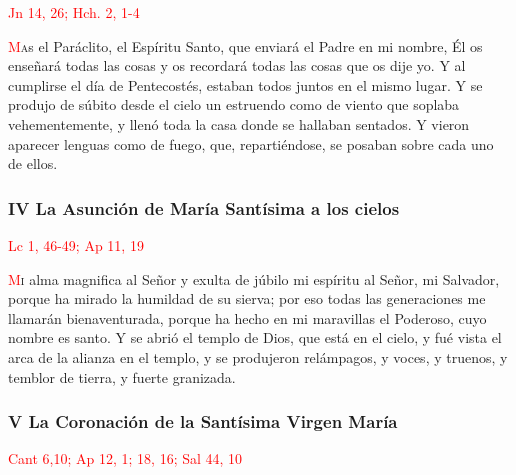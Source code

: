 \documentclass[10pt,twoside]{book}
\begin{document}
\hfill\textcolor{red}{Jn 14, 26; Hch. 2, 1-4}

\lettrine[lines=2]{\textcolor{red}{M}}as el Paráclito, el Espíritu Santo, que enviará el Padre en mi nombre, Él os enseñará todas las cosas y os recordará todas las cosas que os dije yo.
Y al cumplirse el día de Pentecostés, estaban todos juntos en el mismo lugar. Y se produjo de súbito desde el cielo un estruendo como de viento que soplaba vehementemente,
y llenó toda la casa donde se hallaban sentados. Y vieron aparecer lenguas como de fuego, que, repartiéndose, se posaban sobre cada uno de ellos.

\vspace{0.5em}



\vspace{1.5em}

\noindent\subsubsection*{IV La Asunción de María Santísima a los cielos}

\vspace{-0.5em}

\hfill\textcolor{red}{Lc 1, 46-49; Ap 11, 19}

\lettrine[lines=2]{\textcolor{red}{M}}i alma magnifica al Señor y exulta de júbilo mi espíritu al Señor, mi Salvador, porque ha mirado la humildad de su sierva;
por eso todas las generaciones me llamarán bienaventurada, porque ha hecho en mi maravillas el Poderoso, cuyo nombre es santo. Y se abrió el templo de Dios, que está en el cielo,
y fué vista el arca de la alianza en el templo, y se produjeron relámpagos, y voces, y truenos, y temblor de tierra, y fuerte granizada.

\vspace{0.5em}



\vspace{1.5em}

\noindent\subsubsection*{V La Coronación de la Santísima Virgen María}

\vspace{-0.5em}

\hfill\textcolor{red}{Cant 6,10; Ap 12, 1; 18, 16; Sal 44, 10}
\end{document}

